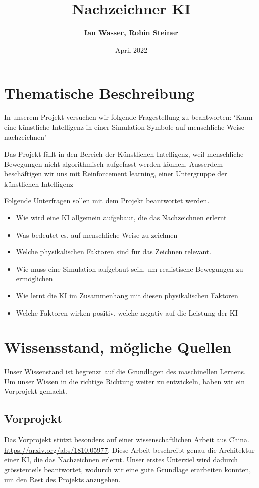 \documentclass{article}
\title{\textbf{Nachzeichner KI}}
\author{\textbf{Ian Wasser, Robin Steiner}}
\date{April 2022}
\begin{document}
\maketitle

\tableofcontents

\pagebreak

\section{Thematische Beschreibung}
\label{chap:thematische-beschreibung}
In unserem Projekt versuchen wir folgende Fragestellung zu beantworten: `Kann
eine künstliche Intelligenz in einer Simulation Symbole auf menschliche Weise
nachzeichnen'

Das Projekt fällt in den Bereich der Künstlichen Intelligenz, weil menschliche
Bewegungen nicht algorithmisch aufgefasst werden können. Ausserdem beschäftigen
wir uns mit Reinforcement learning, einer Untergruppe der künstlichen
Intelligenz

Folgende Unterfragen sollen mit dem Projekt beantwortet werden.

\begin{itemize}
    \item Wie wird eine KI allgemein aufgebaut, die das Nachzeichnen erlernt
    \item Was bedeutet es, auf menschliche Weise zu zeichnen
    \item Welche physikalischen Faktoren sind für das Zeichnen relevant.
    \item Wie muss eine Simulation aufgebaut sein, um realistische Bewegungen zu ermöglichen
    \item Wie lernt die KI im Zusammenhang mit diesen physikalischen Faktoren
    \item Welche Faktoren wirken positiv, welche negativ auf die Leistung der KI
\end{itemize}

\section{Wissensstand, mögliche Quellen}
\label{chap:wissensstand}

Unser Wissenstand ist begrenzt auf die Grundlagen des maschinellen
Lernens. Um unser Wissen in die richtige Richtung weiter zu entwickeln, haben
wir ein Vorprojekt gemacht.

\subsection{Vorprojekt}
Das Vorprojekt stützt besonders auf einer wissenschaftlichen Arbeit aus China.
\url{https://arxiv.org/abs/1810.05977}. Diese Arbeit beschreibt genau die
Architektur einer KI, die das Nachzeichnen erlernt. Unser erstes Unterziel wird
dadurch grösstenteils beantwortet, wodurch wir eine gute Grundlage erarbeiten
konnten, um den Rest des Projekts anzugehen.
\end{document}
